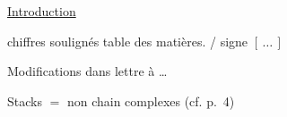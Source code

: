 \uline{Introduction}

chiffres soulignés  table des matières. \hfill / signe $[\,\ldots\,]$

Modifications  dans lettre à \ldots

Stacks $=$ non  chain complexes (cf. p.~4)
\clearpage
